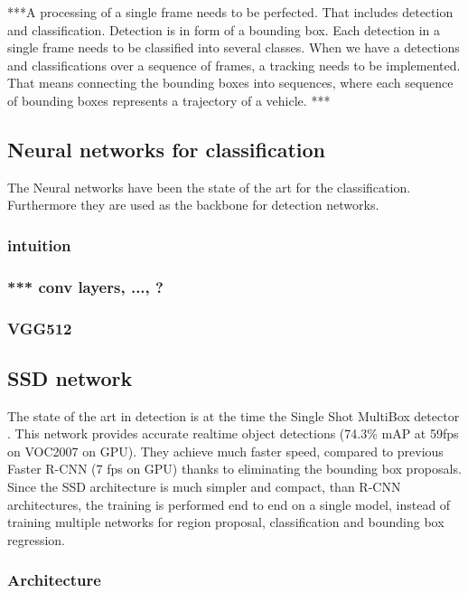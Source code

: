 \documentclass[a4paper,12pt,titlepage]{article}
\numberwithin{figure}{section}
\begin{document}
***A processing of a single frame needs to be perfected. That includes detection and classification. Detection is in form of a bounding box. Each detection in a single frame needs to be classified into several classes. When we have a detections and classifications over a sequence of frames, a tracking needs to be implemented. That means connecting the bounding boxes into sequences, where each sequence of bounding boxes represents a trajectory of a vehicle. ***


\subsection{Neural networks for classification}
\label{sec:neural_networks_classification}
The Neural networks have been the state of the art for the classification. Furthermore they are used as the backbone for detection networks.

\subsubsection{intuition}

\subsubsection{*** conv layers, ..., ?}
\subsubsection{VGG512}

\subsection{SSD network}
\label{sec:ssd}

The state of the art in detection is at the time the Single Shot MultiBox detector \cite{liu2016ssd}. This network provides accurate realtime object detections (74.3\% mAP at 59fps on VOC2007 on GPU). They achieve much faster speed, compared to previous Faster R-CNN (7 fps on GPU) thanks to eliminating the bounding box proposals. Since the SSD architecture is much simpler and compact, than R-CNN architectures, the training is performed end to end on a single model, instead of training multiple networks for region proposal, classification and bounding box regression.

\subsubsection{Architecture}
\end{document}
